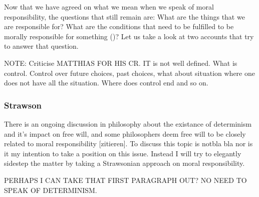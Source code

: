 \documentclass{article}
\begin{document}

Now that we have agreed on what we mean when we speak of moral responsibility,
the questions that still remain are: What are the things that we are responsible
for? What are the conditions that need to be fulfilled to be morally responsible
for something (\cite[p. 370]{smith2008control})? Let us take a look at two
accounts that try to answer that question.


NOTE: Criticise MATTHIAS FOR HIS CR. IT is not well defined. What is control. Control
over future choices, past choices, what about situation where one does not have
all the situation. Where does control end and so on.



%
%
%

\subsubsection{Strawson}

There is an ongoing discussion in philosophy about the existance of determinism
and it's impact on free will, and some philosophers deem free will to be closely related to
moral responsibility [zitieren]. To discuss this topic is notbla bla nor is it
my intention to take a position on this issue. Instead I will try to elegantly
sidestep the matter by taking a Strawsonian approach on moral responsibility.

PERHAPS I CAN TAKE THAT FIRST PARAGRAPH OUT? NO NEED TO SPEAK OF DETERMINISM.
\end{document}
